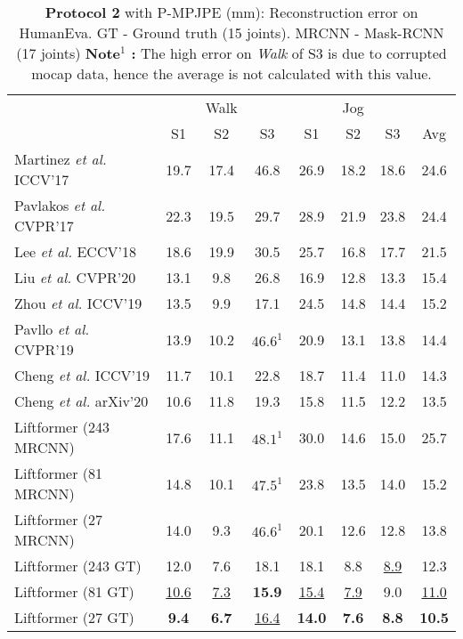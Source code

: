 \documentclass[letterpaper]{article}
\begin{document}
\begin{table}[tp]
\begin{adjustbox}{width=1\columnwidth}
\begin{tabular}{l|ccc|ccc|c}
\hline
&  & Walk &  &  & Jog &  & \\
& S1 & S2 & S3 & S1 & S2 & S3 & Avg\\
\hline
Martinez \textit{et al.} ICCV’17 \cite{martinez17} & 19.7 & 17.4 & 46.8 & 26.9 & 18.2 & 18.6 & 24.6\\
Pavlakos \textit{et al.} CVPR’17 \cite{pavlakos18} & 22.3 & 19.5 & 29.7 & 28.9 & 21.9 & 23.8 & 24.4\\
Lee \textit{et al.} ECCV’18 \cite{lee18} & 18.6 & 19.9 & 30.5 & 25.7 & 16.8 & 17.7 & 21.5\\
Liu \textit{et al.} CVPR’20 \cite{liu20} & 13.1 & 9.8 & 26.8 & 16.9 & 12.8 & 13.3 & 15.4\\
Zhou \textit{et al.} ICCV'19 \cite{zhou19} & 13.5 & 9.9 & 17.1 & 24.5 & 14.8 & 14.4 & 15.2 \\
Pavllo \textit{et al.} CVPR’19 \cite{pavllo19} & 13.9 & 10.2 & $46.6^1$ & 20.9 & 13.1 & 13.8 & 14.4 \\
Cheng \textit{et al.} ICCV'19 \cite{cheng19} & 11.7 & 10.1 & 22.8 & 18.7 & 11.4 & 11.0 & 14.3\\
Cheng \textit{et al.} arXiv'20 \cite{cheng20} & 10.6 & 11.8 & 19.3 & 15.8 & 11.5 & 12.2 & 13.5\\
\hline
Liftformer (243 MRCNN) & 17.6 & 11.1 & $48.1^1$ & 30.0 & 14.6 & 15.0 & 25.7 \\
Liftformer (81 MRCNN) & 14.8 & 10.1 & $47.5^1$ & 23.8 & 13.5 & 14.0 & 15.2 \\
Liftformer (27 MRCNN) & 14.0 & 9.3 & $46.6^1$ & 20.1 & 12.6 & 12.8 & 13.8 \\
\hline
Liftformer (243 GT)  & 12.0 & 7.6 & 18.1 & 18.1 & 8.8 & \underline{8.9} & 12.3\\
Liftformer (81 GT)  & \underline{10.6} & \underline{7.3} & \textbf{15.9} & \underline{15.4} & \underline{7.9} & 9.0 & \underline{11.0}\\
Liftformer (27 GT) & \textbf{9.4} & \textbf{6.7} & \underline{16.4} & \textbf{14.0} & \textbf{7.6} & \textbf{8.8} & \textbf{10.5}\\
\end{tabular}
\end{adjustbox}
\caption{\textbf{Protocol 2} with P-MPJPE (mm): Reconstruction error on HumanEva. GT - Ground truth (15 joints). MRCNN - Mask-RCNN (17 joints)  \textbf{Note$^1$ :} The high error on \textit{Walk} of S3 is due to corrupted mocap data, hence the average is not calculated with this value.}
\label{heval:p-mpjpe}
\end{table}
\end{document}
